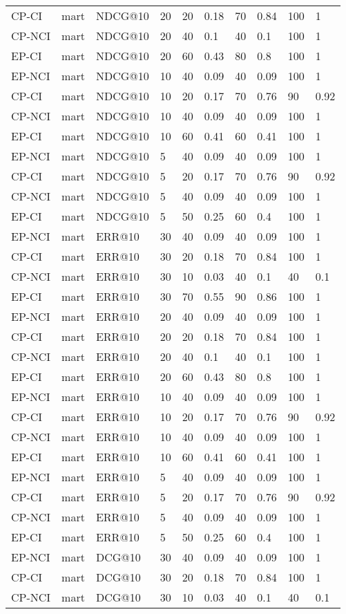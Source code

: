 \begin{landscape}
\begin{longtable}{|*{10}{l|}}
CP-CI&mart&NDCG@10&20&20&0.18&70&0.84&100&1\\
CP-NCI&mart&NDCG@10&20&40&0.1&40&0.1&100&1\\
EP-CI&mart&NDCG@10&20&60&0.43&80&0.8&100&1\\
\hline
EP-NCI&mart&NDCG@10&10&40&0.09&40&0.09&100&1\\
CP-CI&mart&NDCG@10&10&20&0.17&70&0.76&90&0.92\\
CP-NCI&mart&NDCG@10&10&40&0.09&40&0.09&100&1\\
EP-CI&mart&NDCG@10&10&60&0.41&60&0.41&100&1\\
\hline
EP-NCI&mart&NDCG@10&5&40&0.09&40&0.09&100&1\\
CP-CI&mart&NDCG@10&5&20&0.17&70&0.76&90&0.92\\
CP-NCI&mart&NDCG@10&5&40&0.09&40&0.09&100&1\\
EP-CI&mart&NDCG@10&5&50&0.25&60&0.4&100&1\\
\hline
EP-NCI&mart&ERR@10&30&40&0.09&40&0.09&100&1\\
CP-CI&mart&ERR@10&30&20&0.18&70&0.84&100&1\\
CP-NCI&mart&ERR@10&30&10&0.03&40&0.1&40&0.1\\
EP-CI&mart&ERR@10&30&70&0.55&90&0.86&100&1\\
\hline
EP-NCI&mart&ERR@10&20&40&0.09&40&0.09&100&1\\
CP-CI&mart&ERR@10&20&20&0.18&70&0.84&100&1\\
CP-NCI&mart&ERR@10&20&40&0.1&40&0.1&100&1\\
EP-CI&mart&ERR@10&20&60&0.43&80&0.8&100&1\\
\hline
EP-NCI&mart&ERR@10&10&40&0.09&40&0.09&100&1\\
CP-CI&mart&ERR@10&10&20&0.17&70&0.76&90&0.92\\
CP-NCI&mart&ERR@10&10&40&0.09&40&0.09&100&1\\
EP-CI&mart&ERR@10&10&60&0.41&60&0.41&100&1\\
\hline
EP-NCI&mart&ERR@10&5&40&0.09&40&0.09&100&1\\
CP-CI&mart&ERR@10&5&20&0.17&70&0.76&90&0.92\\
CP-NCI&mart&ERR@10&5&40&0.09&40&0.09&100&1\\
EP-CI&mart&ERR@10&5&50&0.25&60&0.4&100&1\\
\hline
EP-NCI&mart&DCG@10&30&40&0.09&40&0.09&100&1\\
CP-CI&mart&DCG@10&30&20&0.18&70&0.84&100&1\\
CP-NCI&mart&DCG@10&30&10&0.03&40&0.1&40&0.1\\

\end{longtable}
\end{landscape}
